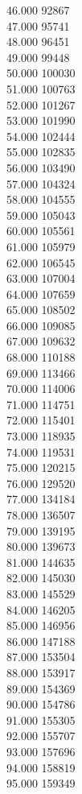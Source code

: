 { 46.000	92867 \\
 47.000	95741 \\
 48.000	96451 \\
 49.000	99448 \\
 50.000	100030 \\
 51.000	100763 \\
 52.000	101267 \\
 53.000	101990 \\
 54.000	102444 \\
 55.000	102835 \\
 56.000	103490 \\
 57.000	104324 \\
 58.000	104555 \\
 59.000	105043 \\
 60.000	105561 \\
 61.000	105979 \\
 62.000	106545 \\
 63.000	107004 \\
 64.000	107659 \\
 65.000	108502 \\
 66.000	109085 \\
 67.000	109632 \\
 68.000	110188 \\
 69.000	113466 \\
 70.000	114006 \\
 71.000	114751 \\
 72.000	115401 \\
 73.000	118935 \\
 74.000	119531 \\
 75.000	120215 \\
 76.000	129520 \\
 77.000	134184 \\
 78.000	136507 \\
 79.000	139195 \\
 80.000	139673 \\
 81.000	144635 \\
 82.000	145030 \\
 83.000	145529 \\
 84.000	146205 \\
 85.000	146956 \\
 86.000	147188 \\
 87.000	153504 \\
 88.000	153917 \\
 89.000	154369 \\
 90.000	154786 \\
 91.000	155305 \\
 92.000	155707 \\
 93.000	157696 \\
 94.000	158819 \\
 95.000	159349 \\
}

